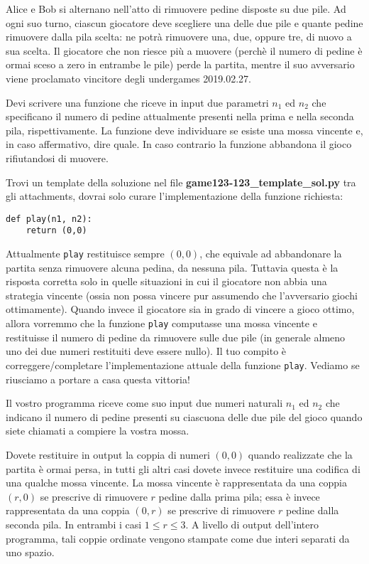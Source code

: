 \makeatletter
\renewcommand{\this@inputfilename}{\texttt{stdin}}
\renewcommand{\this@outputfilename}{\texttt{stdout}}
\makeatother

Alice e Bob si alternano nell'atto di rimuovere pedine disposte su due pile.
Ad ogni suo turno, ciascun giocatore deve scegliere una delle due pile e quante 
pedine rimuovere dalla pila scelta: ne potrà rimuovere una, due, oppure tre, di 
nuovo a sua scelta.
Il giocatore che non riesce più a muovere (perchè il numero di pedine è ormai sceso 
a zero in entrambe le pile) perde la partita, mentre il suo avversario viene proclamato 
vincitore degli undergames 2019.02.27.

Devi scrivere una funzione che riceve in input due parametri $n_1$ ed $n_2$ che 
specificano il numero di pedine attualmente presenti nella prima e nella seconda pila, 
rispettivamente. La funzione deve individuare se esiste una mossa vincente e, in caso 
affermativo, dire quale. In caso contrario la funzione abbandona il gioco rifiutandosi di muovere.

Trovi un template della soluzione nel file \textbf{game123-123\_template\_sol.py} 
tra gli attachments, dovrai solo curare l'implementazione della funzione richiesta:

\begin{verbatim}
def play(n1, n2):
    return (0,0)
\end{verbatim}

Attualmente {\tt play} restituisce sempre $(0,0)$, che equivale ad abbandonare la 
partita senza rimuovere alcuna pedina, da nessuna pila. Tuttavia questa è la risposta 
corretta solo in quelle situazioni in cui il giocatore non abbia una strategia 
vincente (ossia non possa vincere pur assumendo che l'avversario giochi ottimamente). 
Quando invece il giocatore sia in grado di vincere a gioco ottimo, allora vorremmo 
che la funzione {\tt play} computasse una mossa vincente e restituisse il numero 
di pedine da rimuovere sulle due pile (in generale almeno uno dei due numeri restituiti 
deve essere nullo). Il tuo compito è correggere/completare l'implementazione 
attuale della funzione {\tt play}. Vediamo se riusciamo a portare a casa questa vittoria! 


\InputFile
Il vostro programma riceve come suo input due numeri naturali $n_1$ ed $n_2$ che 
indicano il numero di pedine presenti su ciascuona delle due pile del gioco quando 
siete chiamati a compiere la vostra mossa.

\OutputFile
Dovete restituire in output la coppia di numeri $(0,0)$ quando realizzate che la 
partita è ormai persa, in tutti gli altri casi dovete invece restituire una codifica 
di una qualche mossa vincente. La mossa vincente è rappresentata da una coppia $(r,0)$ 
se prescrive di rimuovere $r$ pedine dalla prima pila; essa è invece rappresentata da 
una coppia $(0,r)$ se prescrive di rimuovere $r$ pedine dalla seconda pila. 
In entrambi i casi $1\leq r \leq 3$. A livello di output dell'intero programma, 
tali coppie ordinate vengono stampate come due interi separati da uno spazio.

